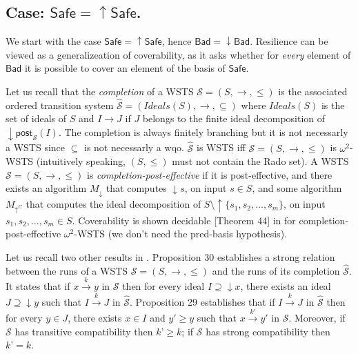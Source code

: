 \documentclass[runningheads]{llncs}
\newcommand{\post}{\textsf{post}}
\newcommand{\Bad}{\textsf{Bad}}
\newcommand{\Safe}{\textsf{Safe}}
\begin{document}
\subsection{Case: $\Safe=\uparrow \Safe$.}\label{safe-up}

We start with the case $\Safe=\uparrow \Safe$, hence $\Bad=\downarrow \Bad$. 
Resilience can be viewed as a generalizeation
 of coverability, as
it asks whether for \emph{every} element of $\Bad$ it is possible to cover an element of the basis of $\Safe$.


Let us recall that the \emph{completion}  \cite{BFM-ic17} of a WSTS $\mathscr{S}=(S,\rightarrow, \leq)$ is the associated ordered transition system $\hat{\mathscr{S}}=(Ideals(S),\rightarrow, \subseteq)$ where $Ideals(S)$ is the set of ideals of $S$ and $I \rightarrow J$ if $J$ belongs to the finite ideal decomposition of $\downarrow \post_{\mathscr{S}}(I)$. The completion is always finitely branching but it is not necessarly a WSTS since $\subseteq$ is not necessarly a wqo. $\hat{\mathscr{S}}$ is WSTS iff $\mathscr{S}=(S,\rightarrow, \leq)$ is $\omega^2$-WSTS (intuitively speaking, $(S,\leq)$ must not contain the Rado set). 
A WSTS $\mathscr{S}=(S,\rightarrow,\leq)$ is {\em completion-post-effective} if
it is post-effective, and there exists an algorithm $M_\downarrow$ that computes 
 $\downarrow s$, on input $s \in S$, and some algorithm $M_{\uparrow^C}$ that computes the ideal decomposition of $S \setminus \uparrow \{ s_1, s_2, \ldots, s_m\}$, on input
 $s_1, s_2, \ldots, s_m \in S$.
Coverability is shown decidable  [Theorem 44] in \cite{BFM-ic17} for completion-post-effective $\omega^2$-WSTS (we don't need the pred-basis hypothesis).

Let us recall two other results in \cite{BFM-ic17}. Proposition 30 establishes a strong relation between the runs of a WSTS $\mathscr{S}=(S,\rightarrow, \leq)$ and the runs of its completion $\hat{\mathscr{S}}$. It states that if $x \xrightarrow{k} y$ in $\mathscr{S}$ then for every ideal $I \supseteq \downarrow x$, there exists an ideal $J \supseteq \downarrow y$ such that $I \xrightarrow{k} J$ in $\hat{\mathscr{S}}$. Proposition 29 establishes that if $I \xrightarrow{k} J$ in $\hat{\mathscr{S}}$ then for every $y \in J$, there exists $x \in I$ and $y' \geq y$ such that $x \xrightarrow{k'} y'$ in $\mathscr{S}$. Moreover, if $\mathscr{S}$ has transitive compatibility then $k’ \geq k$; if $\mathscr{S}$ has strong compatibility then $k’ = k$.
%
\end{document}
